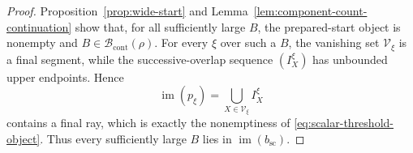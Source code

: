 \begin{proof}
Proposition~\ref{prop:wide-start} and Lemma~\ref{lem:component-count-continuation} show that, for all sufficiently large $B$, the prepared-start object is nonempty and $B\in\mathcal B_{\mathrm{cont}}(\rho)$.  For every $\xi$ over such a $B$, the vanishing set $\mathcal V_\xi$ is a final segment, while the successive-overlap sequence $(I_X^\xi)$ has unbounded upper endpoints.  Hence
\[
\operatorname{im}(p_\xi)
=
\bigcup_{X\in\mathcal V_\xi}I_X^\xi
\]
contains a final ray, which is exactly the nonemptiness of \eqref{eq:scalar-threshold-object}.  Thus every sufficiently large $B$ lies in $\operatorname{im}(b_{\mathrm{sc}})$.
\end{proof}
